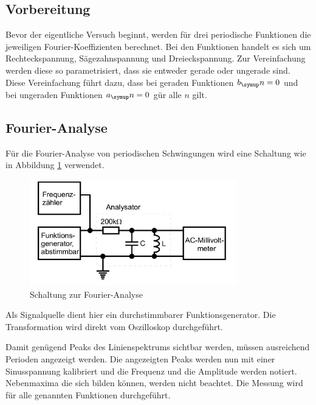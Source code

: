 \subsection{Vorbereitung}
Bevor der eigentliche Versuch beginnt, werden für drei periodische Funktionen
die jeweiligen Fourier-Koeffizienten berechnet. Bei den Funktionen handelt es
sich um Rechteckspannung, Sägezahnspannung und Dreieckspannung. Zur Vereinfachung
werden diese so parametrisiert, dass sie entweder gerade oder ungerade sind.
Diese Vereinfachung führt dazu, dass bei geraden Funktionen $b_\su{n}=0$ und bei
ungeraden Funktionen $a_\su{n}=0$ gür alle $n$ gilt.
\subsection{Fourier-Analyse}
Für die Fourier-Analyse von periodischen Schwingungen wird eine Schaltung wie in
Abbildung \ref{fig:ana} verwendet.
\begin{figure}[h]
  \centering
  \includegraphics[width=0.8\textwidth]{bilder/analyse.jpg}
  \caption{Schaltung zur Fourier-Analyse\cite{351}}
  \label{fig:ana}
\end{figure}
Als Signalquelle dient hier ein durchstimmbarer Funktionsgenerator. Die
Transformation wird direkt vom Oszilloskop durchgeführt.

Damit genügend Peaks des Linienspektrums sichtbar werden, müssen ausreichend
Perioden angezeigt werden. Die angezeigten Peaks werden nun mit einer
Sinusspannung kalibriert und die Frequenz und die Amplitude werden notiert.
Nebenmaxima die sich bilden können, werden nicht beachtet. Die Messung wird für
alle genannten Funktionen durchgeführt.
